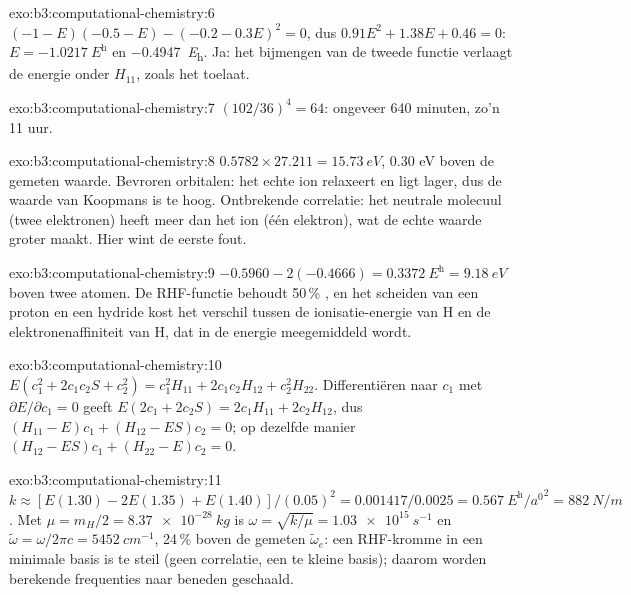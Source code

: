 \begin{solution}{exo:b3:computational-chemistry:6}
$(-1 - E)(-0.5 - E) - (-0.2 - 0.3E)^2 = 0$, dus $0.91E^2 + 1.38E + 0.46 = 0$:
$E = \qty{-1.0217}{\hartree}$ en \qty{-0.4947}{\hartree}. Ja: het bijmengen
van de tweede functie verlaagt de energie onder $H_{11}$, zoals het
 toelaat.
\end{solution}

\begin{solution}{exo:b3:computational-chemistry:7}
$(102/36)^4 = 64$: ongeveer 640 minuten, zo'n 11 uur.
\end{solution}

\begin{solution}{exo:b3:computational-chemistry:8}
$0.5782 \times 27.211 = \qty{15.73}{eV}$, 0.30 eV boven de gemeten waarde.
Bevroren orbitalen: het echte ion relaxeert en ligt lager, dus de waarde
van Koopmans is te hoog. Ontbrekende correlatie: het neutrale molecuul
(twee elektronen) heeft meer  dan het ion (één
elektron), wat de echte waarde groter maakt.
Hier wint de eerste fout.
\end{solution}

\begin{solution}{exo:b3:computational-chemistry:9}
$-0.5960 - 2(-0.4666) = \qty{0.3372}{\hartree} = \qty{9.18}{eV}$ boven twee
atomen. De RHF-functie behoudt 50\,\% , en het scheiden van een
proton en een hydride kost het verschil tussen de ionisatie-energie van H
en de elektronenaffiniteit van H, dat in de energie meegemiddeld wordt.
\end{solution}

\begin{solution}{exo:b3:computational-chemistry:10}
$E(c_1^2 + 2c_1c_2S + c_2^2) = c_1^2H_{11} + 2c_1c_2H_{12} + c_2^2H_{22}$.
Differentiëren naar $c_1$ met $\partial E/\partial c_1 = 0$ geeft
$E(2c_1 + 2c_2S) = 2c_1H_{11} + 2c_2H_{12}$, dus $(H_{11} - E)c_1 + (H_{12} -
ES)c_2 = 0$; op dezelfde manier $(H_{12} - ES)c_1 + (H_{22} - E)c_2 = 0$.
\end{solution}

\begin{solution}{exo:b3:computational-chemistry:11}
$k \approx [E(1.30) - 2E(1.35) + E(1.40)]/(0.05)^2 = 0.001417/0.0025 =
\qty{0.567}{\hartree\per\bohr\squared} = \qty{882}{N/m}$. Met $\mu = m_H/2 =
\qty{8.37e-28}{kg}$ is $\omega = \sqrt{k/\mu} = \qty{1.03e15}{s^{-1}}$ en
$\tilde\omega = \omega/2\pi c = \qty{5452}{cm^{-1}}$, 24\,\% boven de gemeten
$\tilde\omega_e$: een RHF-kromme in een minimale basis is te steil (geen
correlatie, een te kleine basis); daarom worden berekende frequenties naar
beneden geschaald.
\end{solution}

